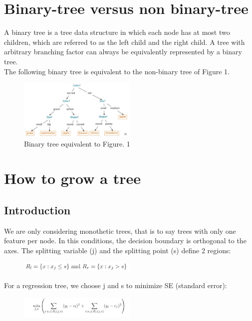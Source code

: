 \documentclass[a4paper,12pt]{article}
\begin{document}
\section{Binary-tree versus non binary-tree}

A binary tree is a tree data structure in which each node has at most two children, which are referred to as the left child and the right child. A tree with arbitrary branching factor can always be equivalently represented by a binary tree.  \\
The following binary tree is equivalent to the non-binary tree of Figure 1.

\begin{figure}[h]
  \centering
  \includegraphics[width=0.5\textwidth]{figures/s2.jpg}
  \caption{Binary tree equivalent to Figure. 1}
  \label{fig:ensemble learning}
\end{figure}

\newpage
\section{How to grow a tree}

\subsection{Introduction}

We are only considering monothetic trees, that is to say trees with only one feature per node. In this conditions, the decision boundary is orthogonal to the axes. The splitting variable (j) and the splitting point (s) define 2 regions: \\
\begin{figure}[h]
  \centering
  \includegraphics[width=0.5\textwidth]{figures/s3.jpg}
  \label{fig:ensemble learning}
\end{figure}


For a regression tree, we choose j and s to minimize SE (standard error):\\
\begin{figure}[h]
  \centering
  \includegraphics[width=0.5\textwidth]{figures/s4.jpg}
  \label{fig:ensemble learning}
\end{figure}
\end{document}

